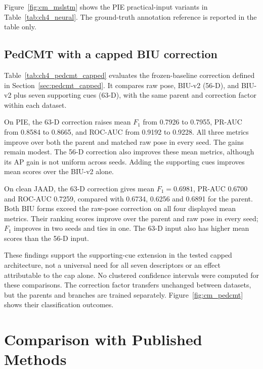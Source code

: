 Figure~\ref{fig:cm_mslstm} shows the PIE practical-input variants in Table~\ref{tab:ch4_neural}.
The ground-truth annotation reference is reported in the table only.


\FloatBarrier
\subsection{PedCMT with a capped BIU correction}

Table~\ref{tab:ch4_pedcmt_capped} evaluates the frozen-baseline correction defined in
Section~\ref{sec:pedcmt_capped}. It compares raw pose, BIU-v2 (56-D), and BIU-v2 plus
seven supporting cues (63-D), with the same parent and correction factor within each
dataset.



On PIE, the 63-D correction raises mean $F_1$ from 0.7926 to 0.7955, PR-AUC from
0.8584 to 0.8665, and ROC-AUC from 0.9192 to 0.9228. All three metrics improve over
both the parent and matched raw pose in every seed. The gains remain modest. The
56-D correction also improves these mean metrics, although its AP gain is not uniform
across seeds. Adding the supporting cues improves mean scores over the BIU-v2 alone.

On clean JAAD, the 63-D correction gives mean $F_1=0.6981$, PR-AUC 0.6700 and
ROC-AUC 0.7259, compared with 0.6734, 0.6256 and 0.6891 for the parent. Both BIU
forms exceed the raw-pose correction on all four displayed mean metrics. Their ranking
scores improve over the parent and raw pose in every seed; $F_1$ improves in two seeds
and ties in one. The 63-D input also has higher mean scores than the 56-D input.

These findings support the supporting-cue extension in the tested capped architecture,
not a universal need for all seven descriptors or an effect attributable to the cap
alone. No clustered confidence intervals were computed for these comparisons. The correction
factor transfers unchanged between datasets, but the parents and branches are trained
separately. Figure~\ref{fig:cm_pedcmt} shows their classification outcomes.

\FloatBarrier

\FloatBarrier
\section{Comparison with Published Methods}\label{sec:ch4_literature}

